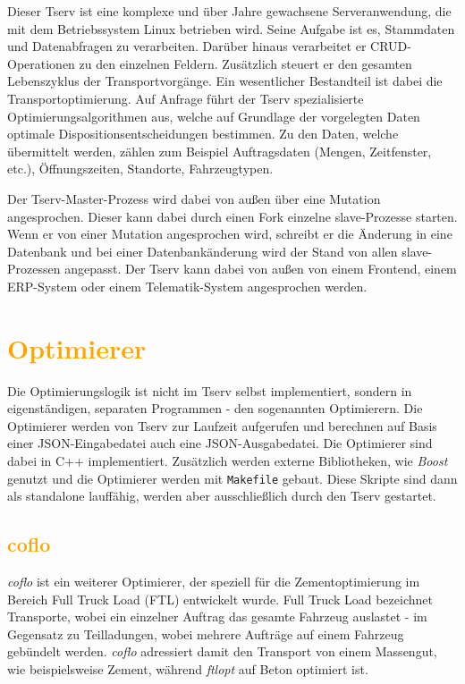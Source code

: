 \documentclass[
    12pt,               
    a4paper,            
    ngerman,            
    parskip=half,       
    headings=normal,   
    numbers=enddot,     
    toc=chapterentrywithdots 
]{scrreprt}\usepackage[utf8]{inputenc}
\begin{document}
Dieser Tserv ist eine komplexe und über Jahre gewachsene Serveranwendung, die mit dem Betriebssystem Linux betrieben wird. Seine Aufgabe ist es, Stammdaten und Datenabfragen zu verarbeiten. Darüber hinaus verarbeitet er CRUD-Operationen zu den einzelnen Feldern. Zusätzlich steuert er den gesamten Lebenszyklus der Transportvorgänge. Ein wesentlicher Bestandteil ist dabei die Transportoptimierung. Auf Anfrage führt der Tserv spezialisierte Optimierungsalgorithmen aus, welche auf Grundlage der vorgelegten Daten optimale Dispositionsentscheidungen bestimmen. Zu den Daten, welche übermittelt werden, zählen zum Beispiel Auftragsdaten (Mengen, Zeitfenster, etc.), Öffnungszeiten, Standorte, Fahrzeugtypen.

Der Tserv-Master-Prozess wird dabei von außen über eine Mutation angesprochen. Dieser kann dabei durch einen Fork einzelne slave-Prozesse starten. Wenn er von einer Mutation angesprochen wird, schreibt er die Änderung in eine Datenbank und bei einer Datenbankänderung wird der Stand von allen slave-Prozessen angepasst. Der Tserv kann dabei von außen von einem Frontend, einem ERP-System oder einem Telematik-System angesprochen werden.

\section{\textcolor{orange}{Optimierer}}
Die Optimierungslogik ist nicht im Tserv selbst implementiert, sondern in eigenständigen, separaten Programmen - den sogenannten Optimierern. Die Optimierer werden von Tserv zur Laufzeit aufgerufen und berechnen auf Basis einer JSON-Eingabedatei auch eine JSON-Ausgabedatei. Die Optimierer sind dabei in C++ implementiert. Zusätzlich werden externe Bibliotheken, wie \textit{Boost} genutzt und die Optimierer werden mit \texttt{Makefile} gebaut. Diese Skripte sind dann als standalone lauffähig, werden aber ausschließlich durch den Tserv gestartet.

\subsection{\textcolor{orange}{coflo}}
\textit{coflo} ist ein weiterer Optimierer, der speziell für die Zementoptimierung im Bereich Full Truck Load (FTL) entwickelt wurde. Full Truck Load bezeichnet Transporte, wobei ein einzelner Auftrag das gesamte Fahrzeug auslastet - im Gegensatz zu Teilladungen, wobei mehrere Aufträge auf einem Fahrzeug gebündelt werden. \textit{coflo} adressiert damit den Transport von einem Massengut, wie beispielsweise Zement, während \textit{ftlopt} auf Beton optimiert ist.
\end{document}
